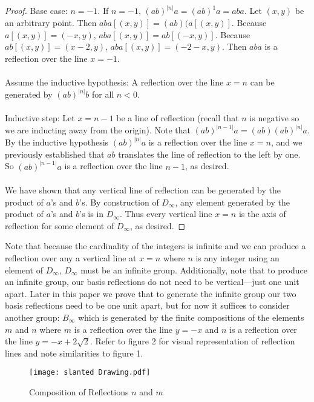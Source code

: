 \documentclass{article}
\theoremstyle{definition}
\begin{document}
\begin{proof}
\noindent Base case: $n = -1$. If $n = -1$,  $(ab)^{|n|}a = (ab)^{1}a = aba$. Let $(x,y)$ be an arbitrary point. Then $aba[(x,y)] = (ab)(a[(x,y)]$. Because $a[(x,y)] = (-x,y)$, $aba[(x,y)] = ab[(-x,y)]$. Because $ab[(x,y)] = (x-2,y)$, $aba[(x,y)] = (-2 - x, y).$ Then $aba$ is a reflection over the line $x = -1$.\\
\\
Assume the inductive hypothesis: A reflection over the line $x = n$ can be generated by $(ab)^{|n|}b$ for all $n < 0$.\\
\\
    Inductive step: Let $x = n-1$ be a line of reflection (recall that $n$ is negative so we are inducting away from the origin). Note that $(ab)^{|n-1|}a = (ab)(ab)^{|n|}a$. By the inductive hypothesis $(ab)^{|n|}a$ is a reflection over the line $x = n$, and we previously established that $ab$ translates the line of reflection to the left by one. So $(ab)^{|n-1|}a$ is a reflection over the line $n - 1$, as desired.  \\
\\
We have shown that any vertical line of reflection can be generated by the product of $a$'s and $b$'s. By construction of $D_{\infty}$, any element generated by the product of $a$'s and $b$'s is in $D_{\infty}$. Thus every vertical line $x = n$ is the axis of reflection for some element of $D_{\infty}$, as desired.
\end{proof}

\noindent Note that because the cardinality of the integers is infinite and we can produce a reflection over any a vertical line at $x=n$ where $n$ is any integer using an element of $D_{\infty}$, $D_{\infty}$ must be an infinite group. Additionally, note that to produce an infinite group, our basis reflections do not need to be vertical—just one unit apart. Later in this paper we prove that to generate the infinite group our two basis reflections need to be one unit apart, but for now it suffices to consider another group: $B_{\infty}$ which is generated by the finite compositions of the elements $m$ and $n$ where $m$ is a reflection over the line $y = -x$ and $n$ is a reflection over the line $y = -x + 2\sqrt{2}$. Refer to figure 2 for visual representation of reflection lines and note similarities to figure 1. 
\begin{wrapfigure}{r}{0.5\textwidth}
  \begin{center}
    \texttt{[image: slanted Drawing.pdf]}
  \end{center}
  \caption{Composition of Reflections $n$ and $m$}
\end{wrapfigure}
\end{document}
